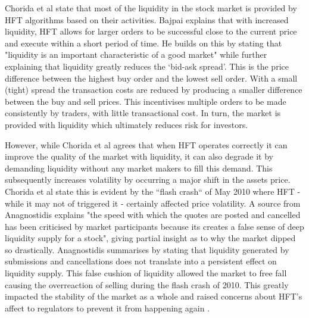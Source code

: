 Chorida et al \cite{REPORT:ChordiaEtAl:2013} state that most of the liquidity in the stock market is provided by HFT algorithms based on their activities. Bajpai \cite{WEB:Bajpai:0001} explains that with increased liquidity, HFT allows for larger orders to be successful close to the current price and execute within a short period of time. He builds on this by stating that "liquidity is an important characteristic of a good market" while further explaining that liquidity greatly reduces the `bid-ask spread'. This is the price difference between the highest buy order and the lowest sell order. With a small (tight) spread the transaction costs are reduced by producing a smaller difference between the buy and sell prices. This incentivises multiple orders to be made consistently by traders, with little transactional cost. In turn, the market is provided with liquidity which ultimately reduces risk for investors. 

However, while Chorida et al \cite{REPORT:ChordiaEtAl:2013} agrees that when HFT operates correctly it can improve the quality of the market with liquidity, it can also degrade it by demanding liquidity without any market makers to fill this demand. This subsequently increases volatility by occurring a major shift in the assets price. Chorida et al state this is evident by the ``flash crash`` of May 2010 where HFT - while it may not of triggered it - certainly affected price volatility. A source from Anagnostidis \cite{UNPUB:Anagnostidis:2017} explains "the speed with which the quotes are posted and cancelled has been criticised by market participants because its creates a false sense of deep liquidity supply for a stock", giving partial insight as to why the market dipped so drastically. Anagnostidis summarises by stating that liquidity generated by submissions and cancellations does not translate into a persistent effect on liquidity supply. This false cushion of liquidity allowed the market to free fall causing the overreaction of selling during the flash crash of 2010. This greatly impacted the stability of the market as a whole and raised concerns about HFT's affect to regulators to prevent it from happening again \cite{WEB:Kaufman:2016}.   

